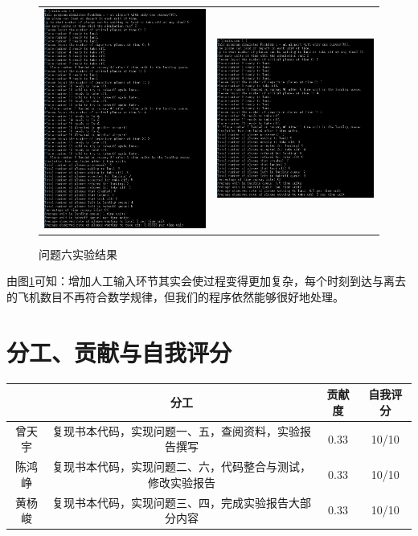 \documentclass[12pt,UTF8]{ctexart}
\begin{document}
\begin{spacing}{1.4}
\begin{figure}[H]
	\centering
	\begin{tabular}{cc}
	\includegraphics[width=0.5\linewidth]{fig/exp_60.PNG} &
	\includegraphics[width=0.5\linewidth]{fig/exp_61.PNG}
	\end{tabular}
	\caption{问题六实验结果}
	\label{fig:6}
\end{figure}
由图\ref{fig:6}可知：增加人工输入环节其实会使过程变得更加复杂，每个时刻到达与离去的飞机数目不再符合数学规律，但我们的程序依然能够很好地处理。


\section{分工、贡献与自我评分}
\begin{table}[H]
	\centering
	\begin{tabular}{|c|c|c|c|}
		\hline
		& 分工 & 贡献度 & 自我评分\\
		\hline
		曾天宇 & 复现书本代码，实现问题一、五，查阅资料，实验报告撰写 & 0.33 & 10/10\\
		陈鸿峥 & 复现书本代码，实现问题二、六，代码整合与测试，修改实验报告 & 0.33 & 10/10\\
		黄杨峻 & 复现书本代码，实现问题三、四，完成实验报告大部分内容 & 0.33 & 10/10\\
		\hline
	\end{tabular}
\end{table}


\end{spacing}
\end{document}
